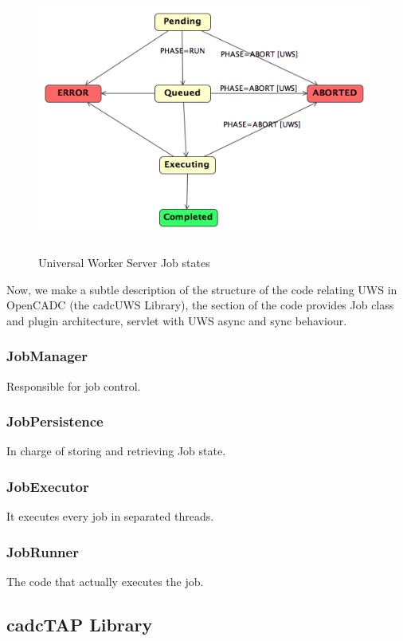 \begin{figure}[H]
\centering
\includegraphics[width=11cm,height=8cm]{images/UWSStates.png}\\
\caption{Universal Worker Server Job states}
\end{figure}

Now, we make a subtle description of the structure of the code relating UWS in OpenCADC (the cadcUWS Library), the section of the code provides Job class and plugin architecture, servlet with UWS async and sync behaviour.

\subsubsection{JobManager}

Responsible for job control.

\subsubsection{JobPersistence}

In charge of storing and retrieving Job state.

\subsubsection{JobExecutor}

It executes every job in separated threads.

\subsubsection{JobRunner}

The code that actually executes the job.


\subsection{cadcTAP Library}

